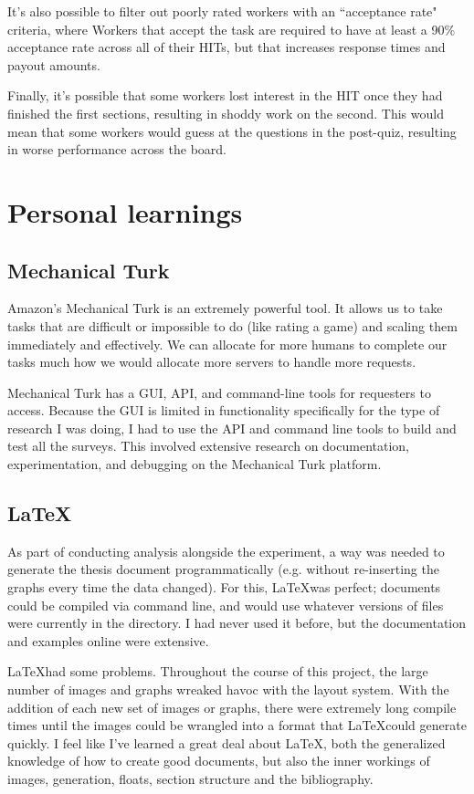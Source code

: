 \documentclass[12pt]{report}
\begin{document}
			It's also possible to filter out poorly rated workers with an ``acceptance rate" criteria, where Workers that accept the task are required to have at least a 90\% acceptance rate across all of their HITs, but that increases response times and payout amounts.

			Finally, it's possible that some workers lost interest in the HIT once they had finished the first sections, resulting in shoddy work on the second. This would mean that some workers would guess at the questions in the post-quiz, resulting in worse performance across the board.

	\section{Personal learnings}

		\subsection{Mechanical Turk}

			Amazon's Mechanical Turk is an extremely powerful tool. It allows us to take tasks that are difficult or impossible to do (like rating a game) and scaling them immediately and effectively. We can allocate for more humans to complete our tasks much how we would allocate more servers to handle more requests. 

			Mechanical Turk has a GUI, API, and command-line tools for requesters to access. Because the GUI is limited in functionality specifically for the type of research I was doing, I had to use the API and command line tools to build and test all the surveys. This involved extensive research on documentation, experimentation, and debugging on the Mechanical Turk platform.

		\subsection{\LaTeX}

			As part of conducting analysis alongside the experiment, a way was needed to generate the thesis document programmatically (e.g. without re-inserting the graphs every time the data changed). For this, \LaTeX was perfect; documents could be compiled via command line, and would use whatever versions of files were currently in the directory. I had never used it before, but the documentation and examples online were extensive.

			\LaTeX had some problems. Throughout the course of this project, the large number of images and graphs wreaked havoc with the layout system. With the addition of each new set of images or graphs, there were extremely long compile times until the images could be wrangled into a format that \LaTeX could generate quickly. I feel like I've learned a great deal about \LaTeX, both the generalized knowledge of how to create good documents, but also the inner workings of images, generation, floats, section structure and the bibliography.
\end{document}
